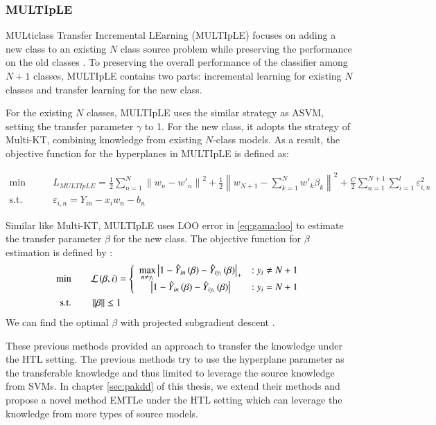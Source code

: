 \subsubsection{MULTIpLE}

MULticlass Transfer Incremental LEarning (MULTIpLE) focuses on adding a new class to an existing $N$ class source problem while preserving the performance on the old classes \cite{kuzborskij2013n}. To preserving the overall performance of the classifier among $N+1$ classes, MULTIpLE contains two parts: incremental learning for existing $N$ classes and transfer learning for the new class.

For the existing $N$ classes, MULTIpLE uses the similar strategy as ASVM, setting the transfer parameter $\gamma$ to 1. For the new class, it adopts the strategy of Multi-KT, combining knowledge from existing $N$-class models. As a result, the objective function for the hyperplanes in MULTIpLE is defined as:

\begin{equation}
\begin{aligned}
\text{min}\qquad {} & L_{MULTIpLE}=\frac{1}{2}\sum\limits_{n = 1}^N {{{\left\| {{w_n} - {{w'}_n}} \right\|}^2}}  + \frac{1}{2}{\left\| {{w_{N + 1}} - \sum\limits_{k = 1}^N {w{'_k}{\beta _k}} } \right\|^2}+ \frac{C}{2}\sum\limits_{n = 1}^{N + 1} {\sum\limits_{i = 1}^l {\varepsilon _{i,n}^2} }  \\
\text{s.t.}\qquad {} &{\varepsilon _{i,n}} = {Y_{in}} -  {x_i}{w_n} - {b_n}
\end{aligned}\label{eq:gama:multiple}
\end{equation}

Similar like Multi-KT, MULTIpLE uses LOO error in \eqref{eq:gama:loo} to estimate the transfer parameter $\beta$ for the new class. The objective function for $\beta$ estimation is defined by \cite{crammer2002algorithmic}:
\begin{equation}\label{eq:gama:multib}
\begin{aligned}
\text{min} \qquad& {\cal L}\left( {\beta ,i} \right) = \left\{ {\begin{array}{*{20}{c}}
	{\mathop {\max }\limits_{n \ne {y_i}} {{\left| {1 - {{\hat Y}_{in}}\left( \beta  \right) - {{\hat Y}_{i{y_i}}}\left( \beta  \right)} \right|}_ + }}&{{:y_i} \ne N + 1}\\
	{\left| {1 - {{\hat Y}_{in}}\left( \beta  \right) - {{\hat Y}_{i{y_i}}}\left( \beta  \right)} \right|}&{{:y_i} = N + 1}
	\end{array}} \right.  \\
\text{s.t.} \qquad& \left\| \beta  \right\| \le 1
\end{aligned}
\end{equation}
We can find the optimal $\beta$ with projected subgradient descent \cite{BoydCO}. 

These previous methods provided an approach to transfer the knowledge under the HTL setting. The previous methods try to use the hyperplane parameter as the transferable knowledge and thus limited to leverage the source knowledge from SVMs. In chapter \ref{sec:pakdd} of this thesis, we extend their methods and propose a novel method EMTLe under the HTL setting which can leverage the knowledge from more types of source models. 